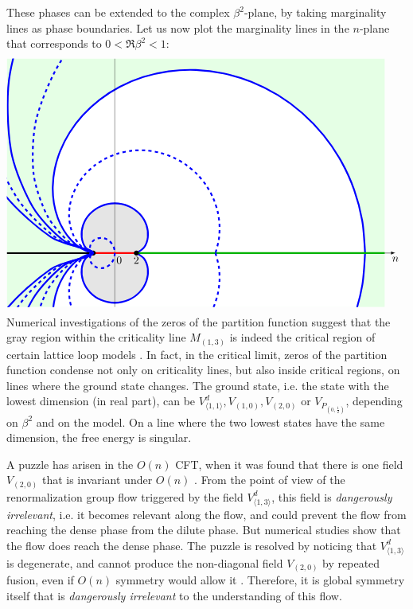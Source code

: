 \documentclass[12pt, a4paper]{article}
\theoremstyle{break}
\begin{document}
These phases can be extended to the complex $\beta^2$-plane, by taking marginality lines as phase boundaries. Let us now plot the marginality lines in the $n$-plane that corresponds to $0<\Re \beta^2<1$:
\newcommand{\margs}[2]{
\draw[domain = {-2/(#1-1)}:{2/(#1-1)}, smooth, variable = \t, #2]
plot({-2*cos(pi/2*(#1-1)*\t r)*cosh(pi/2*(#1-1)*sqrt(abs(\t)-\t*\t)}, {2*sin(pi/2*(#1-1)*\t r)*sinh(pi/2*(#1-1)*sqrt(abs(\t)-\t*\t)});
}
\begin{align}
 \begin{tikzpicture}[baseline=(current  bounding  box.center), scale = .35]
\clip (-10, 18) -- (27, 18) -- (27, -5) -- (-10, -5) -- cycle;
\fill [color = green!10] (-10, 18) -- (25, 18) -- (25, -5) -- (-10, -5) -- cycle;
\margs{5}{ultra thick, blue, samples = 50, fill = white}
\margs{3}{ultra thick, blue, fill = black!10}
\draw[-latex] (-10, 0) -- (26, 0) node[below]{$n$};
\draw (0, -5) -- (0, 18);
\draw[ultra thick, green!70!black] (2, 0) -- (25, 0);
\draw [ultra thick] (-10, 0) -- (-2, 0);
\draw [ultra thick, red] (-2, 0) -- (2, 0); 
\node[below right] at (-.2, 0) {$0$};
\node[below] at (2, 0) {$2$};
\node at (2, 0) [fill, circle, scale = .5] {};
\node at (-2, 0) [fill, circle, scale = .5] {};
 \draw[domain = 0:360, smooth, variable = \t, samples = 30, ultra thick, dashed, blue]
   plot({-2*sin(pi*(1+cos(\t))/4 r)*cosh(pi*sin(\t)/4)}, {2*cos(pi*(1+cos(\t))/4 r)*sinh(pi*sin(\t)/4)});
 \margs{4}{ultra thick, dashed, blue, samples = 50}
\margs{6}{ultra thick, dashed, blue}
\margs{7}{ultra thick, blue}
\margs{8}{ultra thick, dashed, blue}
\margs{9}{ultra thick, blue}
\end{tikzpicture}
\end{align}
Numerical investigations of the zeros of the partition function suggest that the gray region within the criticality line $M_{(1,3)}$ is indeed the critical region of certain lattice loop models \cite{bjjz22}. 
In fact, in the critical limit, zeros of the partition function condense not only on criticality lines, but also inside critical regions, on lines where the ground state changes. The ground state, i.e. the state with the lowest dimension (in real part), can be $V^d_{\langle 1,1\rangle}, V_{(1, 0)}, V_{(2,0)}$ or $V_{P_{(0,\frac12)}}$, depending on $\beta^2$ and on the model. On a line where the two lowest states have the same dimension, the free energy is singular. 

A puzzle has arisen in the $O(n)$ CFT, when it was found that there is one field $V_{(2,0)}$ that is invariant under $O(n)$ \cite{gz20}. From the point of view of the renormalization group flow triggered by the field $V^d_{\langle 1,3\rangle}$, this field is \textit{dangerously irrelevant}, i.e. it becomes relevant along the flow, and could prevent the flow from reaching the dense phase from the dilute phase. But numerical studies show that the flow does reach the dense phase. The puzzle is resolved by noticing that $V^d_{\langle 1,3\rangle}$ is degenerate, and cannot produce the non-diagonal field $V_{(2,0)}$ by repeated fusion, even if $O(n)$ symmetry would allow it \cite{js23}. Therefore, it is global symmetry itself that is \textit{dangerously irrelevant} to the understanding of this flow. 
\end{document}
